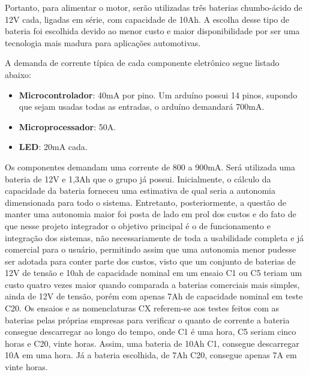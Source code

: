 	
	Portanto, para alimentar o motor, serão utilizadas três baterias chumbo-ácido de 12V cada, ligadas em série, com capacidade de 10Ah. A escolha desse tipo de bateria foi escolhida devido ao menor custo e maior disponibilidade por ser uma tecnologia mais madura para aplicações automotivas.

	A demanda de corrente típica de cada componente eletrônico segue listado abaixo:
	
	\begin{itemize}
		\item \textbf{Microcontrolador}: 40mA por pino. Um arduíno possui 14 pinos, supondo que sejam usadas todas as entradas, o arduíno demandará 700mA.
		\item \textbf{Microprocessador}: 50A.
		\item \textbf{LED}: 20mA cada.

	\end{itemize}

Os componentes demandam uma corrente de 800 a 900mA. Será utilizada uma bateria de 12V e 1,3Ah que o grupo já possui.
	Inicialmente, o cálculo da capacidade da bateria forneceu uma estimativa de qual seria a autonomia dimensionada para todo o sistema. Entretanto, posteriormente, a questão de manter uma autonomia maior foi posta de lado em prol dos custos e do fato de que nesse projeto integrador o objetivo principal é o de funcionamento e integração dos sistemas, não necessariamente de toda a usabilidade completa e já comercial para o usuário, permitindo assim que uma autonomia menor pudesse ser adotada para conter parte dos custos, visto que um conjunto de baterias de 12V de tensão e 10ah de capacidade nominal em um ensaio C1 ou C5 teriam um custo quatro vezes maior quando comparada a baterias comerciais mais simples, ainda de 12V de tensão, porém com apenas 7Ah de capacidade nominal em teste C20. Os ensaios e as nomenclaturas CX referem-se aos testes feitos com as baterias pelas próprias empresas para verificar o quanto de corrente a bateria consegue descarregar ao longo do tempo, onde C1 é uma hora, C5 seriam cinco horas e C20, vinte horas. Assim, uma bateria de 10Ah C1, consegue descarregar 10A em uma hora. Já a bateria escolhida, de 7Ah C20, consegue apenas 7A em vinte horas.
	
